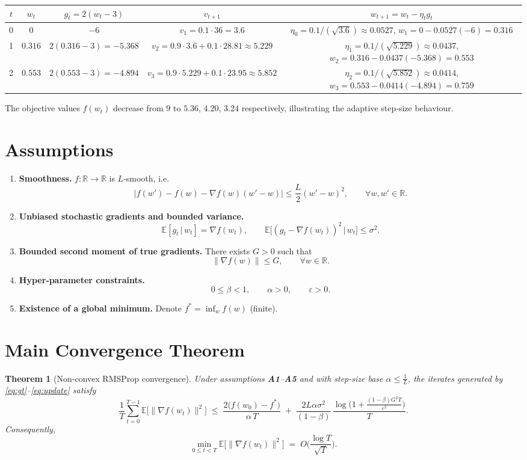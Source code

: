 \documentclass[11pt]{article}
\newtheorem{theorem}{Theorem}
\newcommand{\E}{\mathbb{E}}
\newcommand{\R}{\mathbb{R}}
\begin{document}
\begin{center}
\begin{tabular}{c|c|c|c|c}
$t$ & $w_t$ & $g_t=2(w_t-3)$ & $v_{t+1}$ & $w_{t+1}=w_t-\eta_t g_t$  \\ \hline
0 & $0$ & $-6$ & $v_1=0.1\cdot 36=3.6$ & $\eta_0=0.1/(\sqrt{3.6})\approx0.0527$, $w_1=0-0.0527(-6)=0.316$ \\[4pt]
1 & $0.316$ & $2(0.316-3)=-5.368$ & $v_2=0.9\cdot3.6+0.1\cdot28.81\approx5.229$ & $\eta_1=0.1/(\sqrt{5.229})\approx0.0437$, $w_2=0.316-0.0437(-5.368)=0.553$ \\[4pt]
2 & $0.553$ & $2(0.553-3)=-4.894$ & $v_3=0.9\cdot5.229+0.1\cdot23.95\approx5.852$ & $\eta_2=0.1/(\sqrt{5.852})\approx0.0414$, $w_3=0.553-0.0414(-4.894)=0.759$ 
\end{tabular}
\end{center}
The objective values $f(w_t)$ decrease from $9$ to $5.36$, $4.20$, $3.24$ respectively, illustrating the adaptive step‑size behaviour.

\newpage
\section*{Assumptions}
\begin{enumerate}[label={\bf A\arabic*:}, leftmargin=*]
\item \textbf{Smoothness.} $f:\R\to\R$ is $L$‑smooth, i.e.
\[
|f(w')-f(w)-\nabla f(w)(w'-w)|\le \frac{L}{2}(w'-w)^2,\qquad\forall w,w'\in\R. \tag{A1}
\]

\item \textbf{Unbiased stochastic gradients and bounded variance.}
\[
\E[g_t\,|\,w_t]=\nabla f(w_t),\qquad 
\E\big[(g_t-\nabla f(w_t))^{2}\,\big|\,w_t\big]\le\sigma^{2}. \tag{A2}
\]

\item \textbf{Bounded second moment of true gradients.}
There exists $G>0$ such that
\[
\|\nabla f(w)\|\le G,\qquad\forall w\in\R. \tag{A3}
\]

\item \textbf{Hyper‑parameter constraints.}
\[
0\le\beta<1,\qquad \alpha>0,\qquad \varepsilon>0. \tag{A4}
\]

\item \textbf{Existence of a global minimum.}
Denote $f^{*}= \inf_{w}f(w)$ (finite). 
\end{enumerate}

\section*{Main Convergence Theorem}
\begin{theorem}[Non‑convex RMSProp convergence]
\label{thm:main}
Under assumptions \textbf{A1}–\textbf{A5} and with step‑size base $\alpha\le\frac{1}{L}$, the iterates generated by \eqref{eq:gt}–\eqref{eq:update} satisfy
\[
\frac{1}{T}\sum_{t=0}^{T-1}\E\big[\|\nabla f(w_t)\|^{2}\big]\;\le\;
\frac{2\big(f(w_0)-f^{*}\big)}{\alpha\,T}
\;+\;
\frac{2L\alpha\sigma^{2}}{(1-\beta)}\,
\frac{\log\!\big(1+\tfrac{(1-\beta)G^{2}T}{\varepsilon^{2}}\big)}{T}. \tag{1}
\]
Consequently,
\[
\min_{0\le t<T}\E\big[\|\nabla f(w_t)\|^{2}\big]\;=\;O\!\bigg(\frac{\log T}{\sqrt{T}}\bigg).
\]
\end{theorem}
\end{document}
